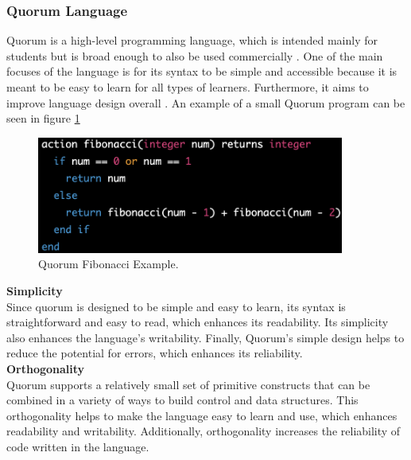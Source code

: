 \noindent\subsubsection{Quorum Language}
\noindent Quorum is a high-level programming language, which is intended mainly for students but is broad enough to also be used commercially \cite{QuorumProgLang}. One of the main focuses of the language is for its syntax to be simple and accessible because it is meant to be easy to learn for all types of learners. Furthermore, it aims to improve language design overall \cite{QuorumVid}. An example of a small Quorum program can be seen in figure \ref{codeEx:Quorum}\\

\begin{figure}[H] 
    \begin{center}
        \includegraphics[width=0.9\textwidth]{Files/Billeder: Analyse/QuorumFiboExample.png}
    \end{center}
    \caption{Quorum Fibonacci Example.}
    \label{codeEx:Quorum}
\end{figure}

\noindent\textbf{Simplicity}\\
\noindent Since quorum is designed to be simple and easy to learn, its syntax is straightforward and easy to read, which enhances its readability. Its simplicity also enhances the language's writability. Finally, Quorum's simple design helps to reduce the potential for errors, which enhances its reliability.\\

\noindent\textbf{Orthogonality}\\
\noindent Quorum supports a relatively small set of primitive constructs that can be combined in a variety of ways to build control and data structures. This orthogonality helps to make the language easy to learn and use, which enhances readability and writability. Additionally, orthogonality increases the reliability of code written in the language.\\


